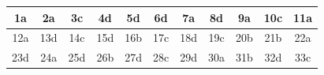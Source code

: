 \begin{table}[!ht]
\centering
\begin{tabular}{|c|c|c|c|c|c|c|c|c|c|c|}
\hline
1a & 2a & 3c & 4d & 5d & 6d & 7a & 8d & 9a & 10c & 11a \\ \hline
12a & 13d & 14c & 15d & 16b & 17c & 18d & 19c & 20b & 21b & 22a \\ \hline
23d & 24a & 25d & 26b & 27d & 28c & 29d & 30a & 31b & 32d & 33c \\ \hline
\end{tabular}
\end{table}